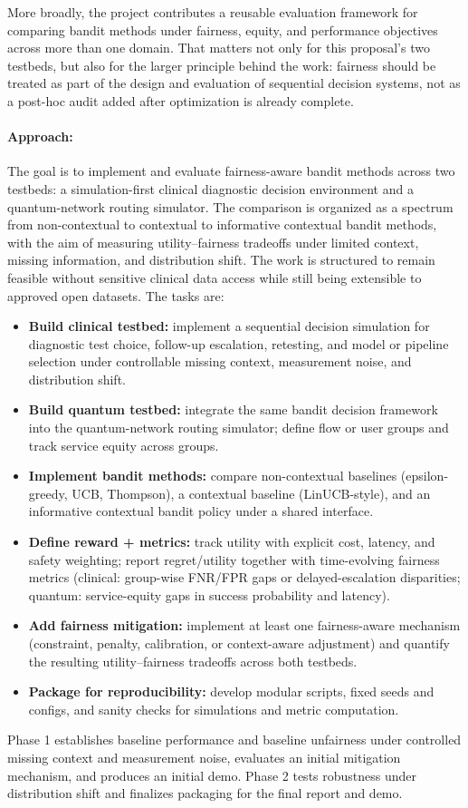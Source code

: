 \documentclass[11pt]{article}
\begin{document}
More broadly, the project contributes a reusable evaluation framework for comparing bandit methods under fairness, equity, and performance objectives across more than one domain. That matters not only for this proposal's two testbeds, but also for the larger principle behind the work: fairness should be treated as part of the design and evaluation of sequential decision systems, not as a post-hoc audit added after optimization is already complete.


\paragraph{Approach:} \hspace{-5mm}
The goal is to implement and evaluate fairness-aware bandit methods across two testbeds: a simulation-first clinical diagnostic decision environment and a quantum-network routing simulator. The comparison is organized as a spectrum from non-contextual to contextual to informative contextual bandit methods, with the aim of measuring utility--fairness tradeoffs under limited context, missing information, and distribution shift. The work is structured to remain feasible without sensitive clinical data access while still being extensible to approved open datasets. The tasks are:
\begin{itemize}
\item {\bf Build clinical testbed:} implement a sequential decision simulation for diagnostic test choice, follow-up escalation, retesting, and model or pipeline selection under controllable missing context, measurement noise, and distribution shift.
\item {\bf Build quantum testbed:} integrate the same bandit decision framework into the quantum-network routing simulator; define flow or user groups and track service equity across groups.
\item {\bf Implement bandit methods:} compare non-contextual baselines (epsilon-greedy, UCB, Thompson), a contextual baseline (LinUCB-style), and an informative contextual bandit policy under a shared interface.
\item {\bf Define reward + metrics:} track utility with explicit cost, latency, and safety weighting; report regret/utility together with time-evolving fairness metrics (clinical: group-wise FNR/FPR gaps or delayed-escalation disparities; quantum: service-equity gaps in success probability and latency).
\item {\bf Add fairness mitigation:} implement at least one fairness-aware mechanism (constraint, penalty, calibration, or context-aware adjustment) and quantify the resulting utility--fairness tradeoffs across both testbeds.
\item {\bf Package for reproducibility:} develop modular scripts, fixed seeds and configs, and sanity checks for simulations and metric computation.
\end{itemize}
Phase 1 establishes baseline performance and baseline unfairness under controlled missing context and measurement noise, evaluates an initial mitigation mechanism, and produces an initial demo. Phase 2 tests robustness under distribution shift and finalizes packaging for the final report and demo.
\end{document}
